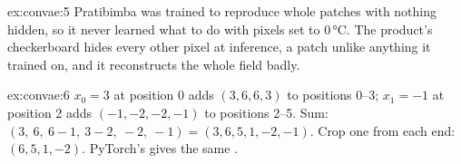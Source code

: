 \begin{solution}{ex:convae:5}
Pratibimba was trained to reproduce whole patches with nothing hidden, so it never learned what to do with pixels set
to 0\,°C. The product's checkerboard hides every other pixel at inference, a patch unlike anything it trained on, and
it reconstructs the whole field badly.
\end{solution}

\begin{solution}{ex:convae:6}
$x_0=3$ at position 0 adds $(3,6,6,3)$ to positions 0--3; $x_1=-1$ at position 2 adds $(-1,-2,-2,-1)$ to positions
2--5. Sum: $(3,\ 6,\ 6-1,\ 3-2,\ -2,\ -1)=(3,6,5,1,-2,-1)$. Crop one from each end: $(6,5,1,-2)$. PyTorch's
 gives the same \tagC.
\end{solution}
